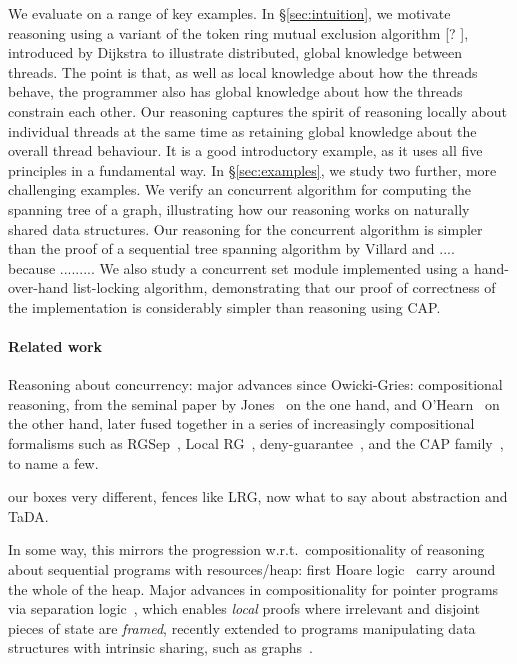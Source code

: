We evaluate \colosl on a range of key  examples. 
In 
\S\ref{sec:intuition}, we  motivate \colosl reasoning using 
a variant of the  token ring mutual exclusion algorithm [? ],
introduced by Dijkstra to illustrate distributed, global knowledge between
threads. The point is that, as well as local knowledge
about how the threads behave, the programmer also has global knowledge
about how the threads constrain each other. Our reasoning captures the
spirit of reasoning locally about individual threads at the same time
as retaining global knowledge about the overall thread behaviour. It
is a good  introductory example, as it uses all five \colosl
principles in a fundamental way. 
In \S\ref{sec:examples}, we 
study two further, more challenging examples. We verify an concurrent algorithm for
computing the spanning tree of a graph, illustrating how our reasoning
works on naturally shared data structures. Our  \colosl reasoning for
the concurrent algorithm 
is simpler than the proof of a sequential tree spanning algorithm
by Villard and ....~\cite{??}  because ......... We also study a concurrent set module
implemented using a hand-over-hand list-locking algorithm,
demonstrating that our proof of correctness of the implementation is
considerably simpler than reasoning using CAP. 










\paragraph{Related work}




Reasoning about concurrency: major advances since Owicki-Gries:
compositional reasoning, from the seminal paper by Jones~\cite{rg} on
the one hand, and O'Hearn~\cite{csl-orig,csl-tcs} on the other hand,
later fused together in a series of increasingly compositional
formalisms such as RGSep~\cite{viktor-marriage}, Local RG~\cite{lrg},
deny-guarantee~\cite{dg}, and the CAP
family~\cite{cap-ecoop10,icap,tada}, to name a few.


our boxes very different,  fences like LRG, now what to say about
abstraction and TaDA. 

In some way, this mirrors the progression w.r.t.\ compositionality of
reasoning about sequential programs with resources/heap: first Hoare
logic~\cite{hoarelogic} carry around the whole of the heap. Major
advances in compositionality for pointer programs via separation
logic~\cite{seplog}, which enables \emph{local} proofs where
irrelevant and disjoint pieces of state are \emph{framed}, recently
extended to programs manipulating data structures with intrinsic
sharing, such as graphs~\cite{ramification}.
